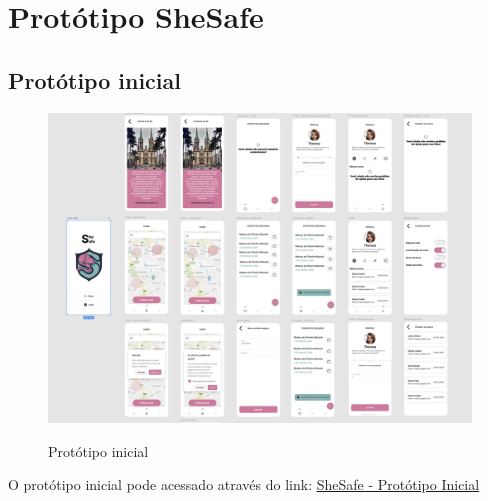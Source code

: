 \section{Protótipo SheSafe}

\subsection{Protótipo inicial}
\begin{figure}[h]
	\begin{center}
		\includegraphics[width=0.8\linewidth]{images/prototipo-inicial.png}\\
	\end{center}
	\caption[Pr]{Protótipo inicial}
	\label{fig:prototipo-inicial}
\end{figure}
\pagebreak

O protótipo inicial pode acessado através do link: \href{https://www.figma.com/proto/ZOxt5eHuQt0RjhagaDpuXU/SheSafe?type=design&node-id=26-369&viewport=1892%2C1064%2C0.71&t=gZiNpzVt2mGhuMDV-0&scaling=min-zoom&starting-point-node-id=26%3A653}{SheSafe - Protótipo Inicial}

